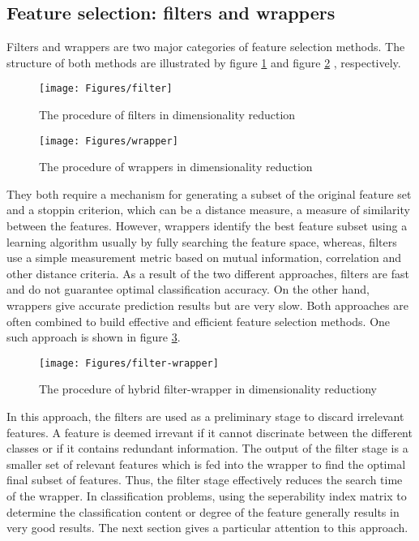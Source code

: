 \subsection{Feature selection: filters and wrappers}
Filters and wrappers are two major categories of feature selection methods. %
The structure of both methods are illustrated by figure \ref{fig:filt} and figure \ref{fig:wrap} , respectively. %
\begin{figure}[ht!]
	\centering
	\texttt{[image: Figures/filter]}
	\caption{The procedure of filters in dimensionality reduction}
	\label{fig:filt}
\end{figure}
\begin{figure}[ht!]
	\centering
	\texttt{[image: Figures/wrapper]}
	\caption{The procedure of wrappers in dimensionality reduction}
	\label{fig:wrap}
\end{figure}
They both require a mechanism for generating a subset of the original feature set and a stoppin criterion, which can be a distance measure, a measure of similarity between the features. However, wrappers identify the best feature subset using a learning algorithm usually by fully searching the feature space, whereas, filters use a simple measurement metric based on mutual information, correlation and other distance criteria. %
As a result of the two different approaches, filters are fast and do not guarantee optimal classification accuracy. On the other hand, wrappers give accurate prediction results but are very slow.
Both approaches are often combined to build effective and efficient feature selection methods. One such approach is shown in figure \ref{fig:filt-wrap}. %
\begin{figure}[ht!]
	\centering
	\texttt{[image: Figures/filter-wrapper]}
	\caption{The procedure of hybrid filter-wrapper in dimensionality reductiony}
	\label{fig:filt-wrap}
\end{figure}
In this approach, the filters are used as a preliminary stage to discard irrelevant features. A feature is deemed irrevant if it cannot discrinate between the different classes or if it contains redundant information. %
The output of the filter stage is a smaller set of relevant features which is fed into the wrapper to find the optimal final subset of features. Thus, the filter stage effectively reduces the search time of the wrapper. 
In classification problems, using the seperability index matrix to determine the classification content or degree of the feature generally results in very good results. %
The next section gives a particular attention to this approach.


